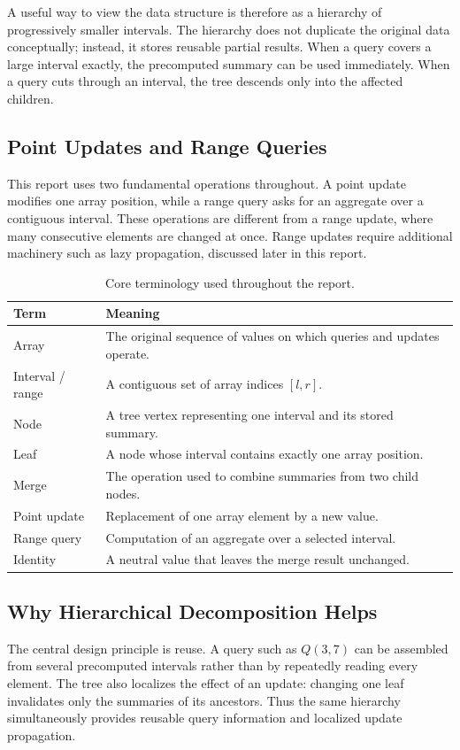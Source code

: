 \documentclass[11pt,open=any]{scrreprt}
\begin{document}
A useful way to view the data structure is therefore as a hierarchy of progressively smaller intervals. The hierarchy does not duplicate the original data conceptually; instead, it stores reusable partial results. When a query covers a large interval exactly, the precomputed summary can be used immediately. When a query cuts through an interval, the tree descends only into the affected children.

\subsection{Point Updates and Range Queries}
This report uses two fundamental operations throughout. A point update modifies one array position, while a range query asks for an aggregate over a contiguous interval. These operations are different from a range update, where many consecutive elements are changed at once. Range updates require additional machinery such as lazy propagation, discussed later in this report.

\begin{table}[H]
\centering
\caption{Core terminology used throughout the report.}
\label{tab:terminology}
\begin{tabular}{>{\raggedright\arraybackslash}p{3.1cm}p{9.2cm}}
\toprule
\textbf{Term} & \textbf{Meaning}\\
\midrule
Array & The original sequence of values on which queries and updates operate.\\
Interval / range & A contiguous set of array indices $[l,r]$.\\
Node & A tree vertex representing one interval and its stored summary.\\
Leaf & A node whose interval contains exactly one array position.\\
Merge & The operation used to combine summaries from two child nodes.\\
Point update & Replacement of one array element by a new value.\\
Range query & Computation of an aggregate over a selected interval.\\
Identity & A neutral value that leaves the merge result unchanged.\\
\bottomrule
\end{tabular}
\end{table}

\subsection{Why Hierarchical Decomposition Helps}
The central design principle is reuse. A query such as $Q(3,7)$ can be assembled from several precomputed intervals rather than by repeatedly reading every element. The tree also localizes the effect of an update: changing one leaf invalidates only the summaries of its ancestors. Thus the same hierarchy simultaneously provides reusable query information and localized update propagation.
\end{document}
